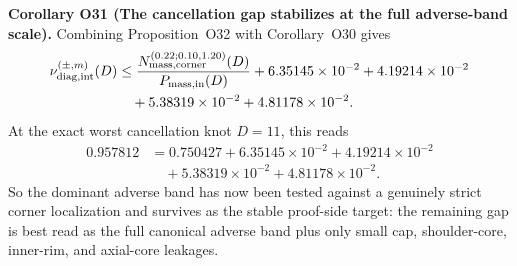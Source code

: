 \documentclass[aps,prd,onecolumn,notitlepage,nofootinbib,superscriptaddress,11pt,floatfix]{revtex4-2}
\begin{document}
\medskip\noindent\textbf{Corollary O31 (The cancellation gap stabilizes at the full adverse-band scale).}
Combining Proposition~O32 with Corollary~O30 gives
\[
\begin{aligned}
\nu_{\rm diag,int}^{(\pm,m)}(D)
&\le
\frac{N_{\rm mass,corner}^{(0.22;0.10,1.20)}(D)}
{P_{\rm mass,in}(D)}
+6.35145\times10^{-2}
+4.19214\times10^{-2}\\
&\quad
+5.38319\times10^{-2}
+4.81178\times10^{-2}.
\end{aligned}
\]
At the exact worst cancellation knot \(D=11\), this reads
\[
\begin{aligned}
0.957812
&=
0.750427
+6.35145\times10^{-2}
+4.19214\times10^{-2}\\
&\quad
+5.38319\times10^{-2}
+4.81178\times10^{-2}.
\end{aligned}
\]
So the dominant adverse band has now been tested against a genuinely strict corner localization and survives as the stable proof-side target: the remaining gap is best read as the full canonical adverse band plus only small cap, shoulder-core, inner-rim, and axial-core leakages.
\end{document}
